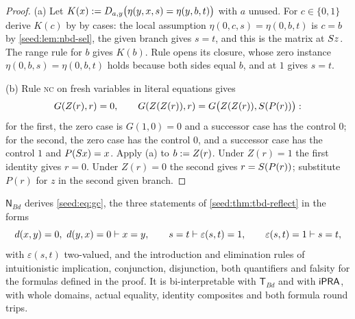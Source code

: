 \begin{proof}
(a) Let $K(x)\mathrel{:=}D_{a,y}\bigl(\eta(y,x,s)=\eta(y,b,t)\bigr)$ with $a$
unused. For $c\in\{0,1\}$ derive $K(c)$ by  by cases: the local
assumption $\eta(0,c,s)=\eta(0,b,t)$ is $c=b$ by \cref{seed:lem:nbd-sel},
the given branch gives $s=t$, and this is the matrix at $S z$. The range
rule for $b$ gives $K(b)$. Rule  opens its closure, whose zero
instance $\eta(0,b,s)=\eta(0,b,t)$ holds because both sides equal $b$, and
 at $1$ gives $s=t$.

(b) Rule \textsc{nc} on fresh variables in literal equations gives
\[
 G(Z(r),r)=0,\qquad G(Z(Z(r)),r)=G\bigl(Z(Z(r)),S(P(r))\bigr):
\]
for the first, the zero case is $G(1,0)=0$ and a successor case has the
control $0$; for the second, the zero case has the control $0$, and a
successor case has the control $1$ and $P(S x)=x$. Apply (a) to
$b\mathrel{:=} Z(r)$. Under $Z(r)=1$ the first identity gives $r=0$. Under
$Z(r)=0$ the second gives $r=S(P(r))$; substitute $P(r)$ for $z$ in the
second given branch.
\end{proof}

\begin{theorem}\label{seed:thm:nbd}
$\mathsf{N}_{Bd}$ derives \eqref{seed:eq:gc}, the three statements of
\cref{seed:thm:tbd-reflect} in the forms
\[
 d(x,y)=0,\ d(y,x)=0\vdash x=y,\qquad
 s=t\vdash\varepsilon(s,t)=1,\qquad\varepsilon(s,t)=1\vdash s=t,
\]
with $\varepsilon(s,t)$ two-valued, and the introduction and elimination
rules of intuitionistic implication, conjunction, disjunction, both
quantifiers and falsity for the formulas defined in the proof. It is
bi-interpretable with $\mathsf{T}_{Bd}$ and with $\mathsf{iPRA}$, with whole domains,
actual equality, identity composites and both formula round trips.
\end{theorem}

